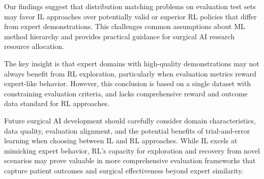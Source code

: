\documentclass[runningheads]{llncs}
\begin{document}
Our findings suggest that distribution matching problems on evaluation test sets may favor IL approaches over potentially valid or superior RL policies that differ from expert demonstrations. This challenges common assumptions about ML method hierarchy and provides practical guidance for surgical AI research resource allocation.

The key insight is that expert domains with high-quality demonstrations may not always benefit from RL exploration, particularly when evaluation metrics reward expert-like behavior. However, this conclusion is based on a single dataset with constraining evaluation criteria, and lacks comprehensive reward and outcome data standard for RL approaches.

Future surgical AI development should carefully consider domain characteristics, data quality, evaluation alignment, and the potential benefits of trial-and-error learning when choosing between IL and RL approaches. While IL excels at mimicking expert behavior, RL's capacity for exploration and recovery from novel scenarios may prove valuable in more comprehensive evaluation frameworks that capture patient outcomes and surgical effectiveness beyond expert similarity.

%
%
%


\end{document}
